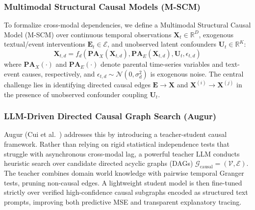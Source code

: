 \subsubsection{Multimodal Structural Causal Models (M-SCM)}
To formalize cross-modal dependencies, we define a Multimodal Structural Causal Model (M-SCM) over continuous temporal observations $\mathbf{X}_t \in \mathbb{R}^D$, exogenous textual/event interventions $\mathbf{E}_t \in \mathcal{E}$, and unobserved latent confounders $\mathbf{U}_t \in \mathbb{R}^K$:
\begin{equation}
    \mathbf{X}_{t, d} = f_d\left( \mathbf{PA}_X(\mathbf{X}_{t, d}), \mathbf{PA}_E(\mathbf{X}_{t, d}), \mathbf{U}_t, \epsilon_{t, d} \right)
\end{equation}
where $\mathbf{PA}_X(\cdot)$ and $\mathbf{PA}_E(\cdot)$ denote parental time-series variables and text-event causes, respectively, and $\epsilon_{t, d} \sim \mathcal{N}(0, \sigma_d^2)$ is exogenous noise. The central challenge lies in identifying directed causal edges $\mathbf{E} \to \mathbf{X}$ and $\mathbf{X}^{(i)} \to \mathbf{X}^{(j)}$ in the presence of unobserved confounder coupling $\mathbf{U}_t$.

\subsubsection{LLM-Driven Directed Causal Graph Search (Augur)}
Augur (Cui et al.~\cite{Cui2025Augur}) addresses this by introducing a teacher-student causal framework. Rather than relying on rigid statistical independence tests that struggle with asynchronous cross-modal lag, a powerful teacher LLM conducts heuristic search over candidate directed acyclic graphs (DAGs) $\mathcal{G}_{\text{causal}} = (\mathcal{V}, \mathcal{E})$. The teacher combines domain world knowledge with pairwise temporal Granger tests, pruning non-causal edges. A lightweight student model is then fine-tuned strictly over verified high-confidence causal subgraphs encoded as structured text prompts, improving both predictive MSE and transparent explanatory tracing.

